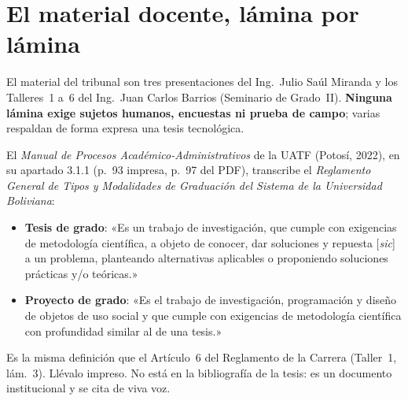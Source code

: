 \documentclass[11pt,a4paper]{article}
\begin{document}
\section{El material docente, lámina por lámina}\label{sec:material}

El material del tribunal son tres presentaciones del Ing.~Julio Saúl Miranda y los Talleres~1 a~6 del Ing.~Juan Carlos Barrios (Seminario de Grado~II). \textbf{Ninguna lámina exige sujetos humanos, encuestas ni prueba de campo}; varias respaldan de forma expresa una tesis tecnológica.

\begin{hallazgo}
El \emph{Manual de Procesos Académico-Administrativos} de la UATF (Potosí, 2022), en su apartado 3.1.1 (p.~93 impresa, p.~97 del PDF), transcribe el \emph{Reglamento General de Tipos y Modalidades de Graduación del Sistema de la Universidad Boliviana}:
\begin{itemize}
\item \textbf{Tesis de grado}: «Es un trabajo de investigación, que cumple con exigencias de metodología científica, a objeto de conocer, dar soluciones y repuesta [\emph{sic}] a un problema, planteando alternativas aplicables o proponiendo soluciones prácticas y/o teóricas.»
\item \textbf{Proyecto de grado}: «Es el trabajo de investigación, programación y diseño de objetos de uso social y que cumple con exigencias de metodología científica con profundidad similar al de una tesis.»
\end{itemize}
Es la misma definición que el Artículo~6 del Reglamento de la Carrera (Taller~1, lám.~3). Llévalo impreso. No está en la bibliografía de la tesis: es un documento institucional y se cita de viva voz.
\end{hallazgo}
\end{document}
